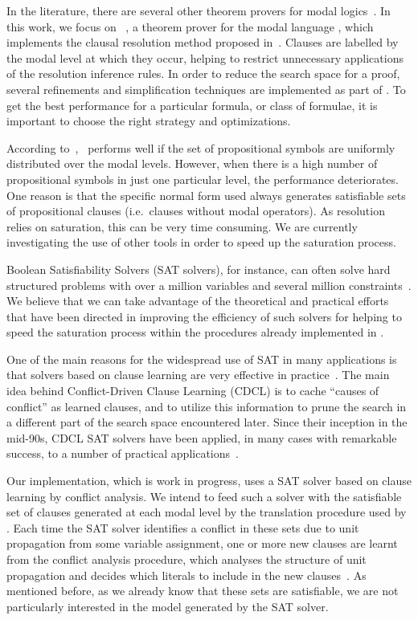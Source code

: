 In the literature, there are several other theorem provers for modal
logics~\cite{hylores,eprover,spass,Vampire}. In this work, we focus on
\ksp~\cite{Nalon2016}, a theorem prover for the modal language
, which implements the clausal resolution method proposed
in~\cite{nalon2015modal}. Clauses are labelled by the modal level at which they
occur, helping to restrict unnecessary applications of the resolution inference
rules. In order to reduce the
search space for a proof, several refinements and simplification techniques are implemented as part of \ksp. To get the best performance for a
particular formula, or class of formulae, it is important to choose the right
strategy and optimizations. 

According to~\cite{Nalon2016}, \ksp~performs well if the set of propositional
symbols are uniformly distributed over the modal levels. However, when there is
a high number of propositional symbols in just one particular level, the
performance deteriorates. One reason is that the specific normal form used
always generates satisfiable sets of propositional clauses (i.e.\ clauses
without modal operators). As resolution relies on saturation, this can be very
time consuming. We are currently investigating the use of other tools in order
to speed up the saturation process. 

Boolean Satisfiability Solvers (SAT solvers), for instance, can often solve hard
structured problems with over a million variables and several million
constraints~\cite{satchapter}. We believe that we can take advantage of the
theoretical and practical efforts that have been directed in improving the
efficiency of such solvers for helping to speed the saturation process within the procedures already implemented in \ksp.

One of the main reasons for the widespread use of SAT in many applications is
that solvers based on clause learning are very effective in
practice~\cite{satchapter}. The main idea behind Conflict-Driven Clause Learning
(CDCL) is to cache ``causes of conflict'' as learned clauses, and to utilize this
information to prune the search in a different part of the search space
encountered later. Since their inception in the mid-90s, CDCL SAT solvers have
been applied, in many cases with remarkable success, to a number of practical
applications~\cite{cdclchapter}. 

Our implementation, which is work in progress, uses a SAT solver based on clause
learning by conflict analysis. We intend to feed such a solver with the
satisfiable set of clauses generated at each modal level by the translation
procedure used by \ksp.  Each time the SAT solver identifies a conflict in these
sets due to unit propagation from some variable assignment, one or more new
clauses are learnt from the conflict analysis procedure, which analyses the
structure of unit propagation and decides which literals to include in the new
clauses~\cite{cdclchapter}. As mentioned before, as we already know that these
sets are satisfiable, we are not particularly interested in the model generated
by the SAT solver. 

